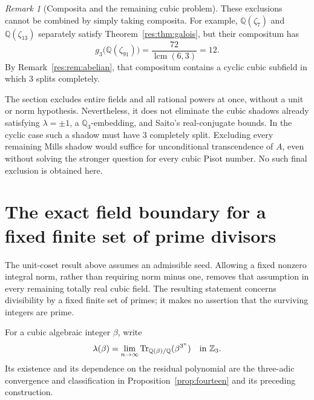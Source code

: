 \documentclass[11pt,a4paper]{article}
\theoremstyle{remark}\newtheorem{remark}[theorem]{Remark}
\newcommand{\Z}{\mathbb Z}\newcommand{\Q}{\mathbb Q}
\newcommand{\Tr}{\operatorname{Tr}}\newcommand{\Nm}{\operatorname{N}}
\begin{document}
\begin{remark}[Composita and the remaining cubic problem]
\label{res:rem:limits}
These exclusions cannot be combined by simply taking composita.
For example, $\Q(\zeta_7)$ and $\Q(\zeta_{13})$ separately satisfy
Theorem~\ref{res:thm:galois}, but their compositum has
\[
 g_3\bigl(\Q(\zeta_{91})\bigr)
 =\frac{72}{\operatorname{lcm}(6,3)}=12.
\]
By Remark~\ref{res:rem:abelian}, that compositum contains a cyclic
cubic subfield in which $3$ splits completely.

The section excludes entire fields and all rational powers at once,
without a unit or norm hypothesis. Nevertheless, it does not eliminate
the cubic shadows already satisfying $\lambda=\pm1$, a
$\Q_3$-embedding, and Saito's real-conjugate bounds. In the cyclic
case such a shadow must have $3$ completely split. Excluding every
remaining Mills shadow would suffice for unconditional transcendence
of $A$, even without solving the stronger question for every cubic
Pisot number. No such final exclusion is obtained here.
\end{remark}


\section{The exact field boundary for a fixed finite set of prime divisors}
\label{res:sec:barrier}

The unit-coset result above assumes an admissible seed. Allowing a
fixed nonzero integral norm, rather than requiring norm minus one,
removes that assumption in every remaining totally real cubic field.
The resulting statement concerns divisibility by a fixed finite set
of primes; it makes no assertion that the surviving integers are prime.

For a cubic algebraic integer $\beta$, write
\[
 \lambda(\beta)=\lim_{n\to\infty}
       \Tr_{\Q(\beta)/\Q}(\beta^{3^n})\quad\hbox{in }\Z_3.
\]
Its existence and its dependence on the residual polynomial are the
three-adic convergence and classification in
Proposition~\ref{prop:fourteen} and its preceding construction.
\end{document}
